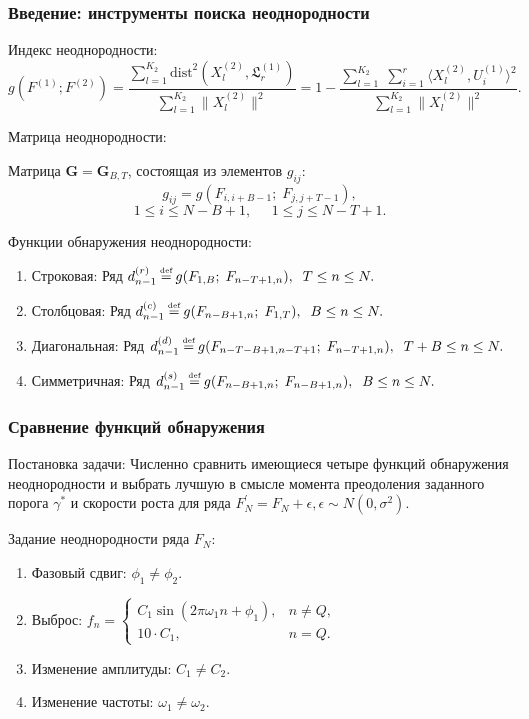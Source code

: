 \documentclass[pdf, 9pt,intlimits, unicode]{beamer}
\newcommand\eqdef{\mathrel{\stackrel{\makebox[0pt]{\mbox{\normalfont\tiny def}}}{=}}}
\begin{document}
	\begin{frame}
		\frametitle{Введение: инструменты поиска неоднородности}	
		{\color{blue} Индекс неоднородности:} 
		\small{
		$$ g(F^{(1)}; F^{(2)}) = \frac{\sum\limits_{l=1}^{K_2}\mathrm{dist}^2(X_l^{(2)}, \mathfrak{L}_r^{(1)})}{\sum\limits_{l=1}^{K_2}\|X_l^{(2)}\|^2} =
		1 - \frac{\sum\limits_{l=1}^{K_2}\;\sum\limits_{i=1}^{r}\langle X_l^{(2)}, U_i^{(1)}\rangle^2}{\sum\limits_{l=1}^{K_2}\|X_l^{(2)}\|^2}. $$
		}
	
		\bigskip
		
		{\color{blue} Матрица неоднородности:}
		
		Матрица $ \mathbf{G} = \mathbf{G}_{B, T} $, состоящая из элементов $g_{ij}$:
		$$g_{ij} = g(F_{i, i+B-1};\;F_{j, j+T-1}), $$ 
		$$1 \leq i \leq N-B+1,\;\;\;\;\; 1 \leq j \leq N-T+1.$$
		
		\bigskip
		
		{\color{blue} Функции обнаружения неоднородности:}
		\begin{enumerate}
			\item Строковая: Ряд $ d_{n-1}^{(r)} \eqdef g(F_{1, B};\; F_{n-T+1, n}), \;\; T \leq n \leq N. $
			
			\item Столбцовая: Ряд $ d_{n-1}^{(c)} \eqdef g(F_{n-B+1, n};\; F_{1, T}), \;\; B \leq n \leq N. $
			
			\item Диагональная: Ряд $ d_{n-1}^{(d)} \eqdef g(F_{n-T-B+1, n-T+1};\; F_{n-T+1, n}), \;\; T + B \leq n \leq N. $
			
			\item Симметричная: Ряд $ d_{n-1}^{(s)} \eqdef g(F_{n-B+1, n};\; F_{n-B+1, n}), \;\; B \leq n \leq N. $
			
		\end{enumerate}
	\end{frame}

	\begin{frame}
		\frametitle{Сравнение функций обнаружения}
		
		{\color{blue} Постановка задачи:} 
		Численно сравнить имеющиеся четыре функций обнаружения неоднородности и выбрать лучшую в смысле момента преодоления заданного порога $ \gamma^* $ и скорости роста для ряда $ F_N^{'} = F_N + \epsilon, \epsilon \sim N(0, \sigma^2) $.
		
		\bigskip
		{\color{blue} Задание неоднородности ряда $ F_N $:}
		\begin{enumerate}
			\item Фазовый сдвиг: $\phi_1 \neq \phi_2$.
			\item Выброс: $f_n = 
							\begin{cases}
								C_1\sin(2\pi\omega_1n + \phi_1), & n \neq Q, \\
								10\cdot C_1, & n = Q.
							\end{cases}
						$
			\item Изменение амплитуды: $C_1 \neq C_2$.
			\item Изменение частоты: $\omega_1 \neq \omega_2$.
		\end{enumerate}
	\end{frame}
	
\end{document}
